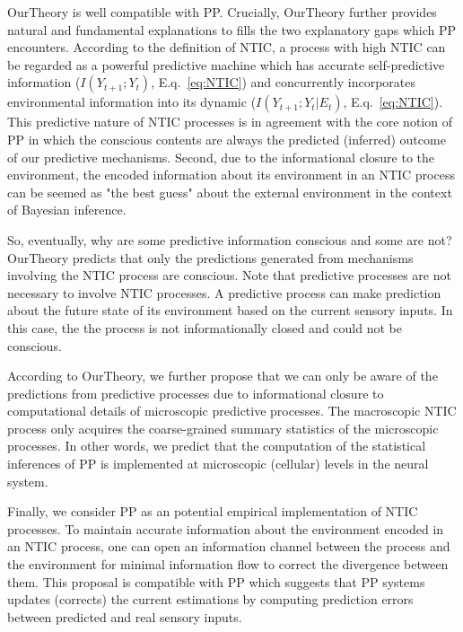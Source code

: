 \documentclass[utf8]{article}
\begin{document}
    		\ac{OurTheory} is well compatible with PP. Crucially, \ac{OurTheory} further provides natural and fundamental explanations to fills the two explanatory gaps which PP encounters. According to the definition of NTIC, a process with high NTIC can be regarded as a powerful predictive machine which has accurate self-predictive information ($I(Y_{t+1};Y_{t})$, E.q.~\ref{eq:NTIC}) and concurrently incorporates environmental information into its dynamic ($I(Y_{t+1};Y_{t}|E_{t})$, E.q.~\ref{eq:NTIC}). This predictive nature of NTIC processes is in agreement with the core notion of PP in which the conscious contents are always the predicted (inferred) outcome of our predictive mechanisms. Second, due to the informational closure to the environment, the encoded information about its environment in an NTIC process can be seemed as "the best guess" about the external environment in the context of Bayesian inference. 
    		
    		So, eventually, why are some predictive information conscious and some are not? \ac{OurTheory} predicts that only the predictions generated from mechanisms involving the NTIC process are conscious. Note that predictive processes are not necessary to involve NTIC processes. A predictive process can make prediction about the future state of its environment based on the current sensory inputs. In this case, the the process is not informationally closed and could not be conscious.
    		
            According to \ac{OurTheory}, we further propose that we can only be aware of the predictions from predictive processes due to informational closure to computational details of microscopic predictive processes. The macroscopic NTIC process only acquires the coarse-grained summary statistics of the microscopic processes. In other words, we predict that the computation of the statistical inferences of PP is implemented at microscopic (cellular) levels in the neural system. 
        
    		Finally, we consider PP as an potential empirical implementation of NTIC processes. To maintain accurate information about the environment encoded in an NTIC process, one can open an information channel between the process and the environment for minimal information flow to correct the divergence between them. This proposal is compatible with PP which suggests that PP systems updates (corrects) the current estimations by computing prediction errors between predicted and real sensory inputs. 
    		
\end{document}
